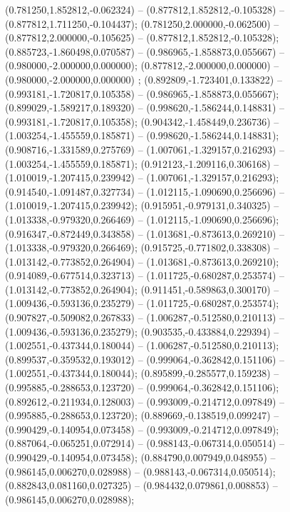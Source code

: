  (0.781250,1.852812,-0.062324) -- (0.877812,1.852812,-0.105328) -- (0.877812,1.711250,-0.104437);
 (0.781250,2.000000,-0.062500) -- (0.877812,2.000000,-0.105625) -- (0.877812,1.852812,-0.105328);
 (0.885723,-1.860498,0.070587) -- (0.986965,-1.858873,0.055667) -- (0.980000,-2.000000,0.000000);
 (0.877812,-2.000000,0.000000) -- (0.980000,-2.000000,0.000000) ;
 (0.892809,-1.723401,0.133822) -- (0.993181,-1.720817,0.105358) -- (0.986965,-1.858873,0.055667);
 (0.899029,-1.589217,0.189320) -- (0.998620,-1.586244,0.148831) -- (0.993181,-1.720817,0.105358);
 (0.904342,-1.458449,0.236736) -- (1.003254,-1.455559,0.185871) -- (0.998620,-1.586244,0.148831);
 (0.908716,-1.331589,0.275769) -- (1.007061,-1.329157,0.216293) -- (1.003254,-1.455559,0.185871);
 (0.912123,-1.209116,0.306168) -- (1.010019,-1.207415,0.239942) -- (1.007061,-1.329157,0.216293);
 (0.914540,-1.091487,0.327734) -- (1.012115,-1.090690,0.256696) -- (1.010019,-1.207415,0.239942);
 (0.915951,-0.979131,0.340325) -- (1.013338,-0.979320,0.266469) -- (1.012115,-1.090690,0.256696);
 (0.916347,-0.872449,0.343858) -- (1.013681,-0.873613,0.269210) -- (1.013338,-0.979320,0.266469);
 (0.915725,-0.771802,0.338308) -- (1.013142,-0.773852,0.264904) -- (1.013681,-0.873613,0.269210);
 (0.914089,-0.677514,0.323713) -- (1.011725,-0.680287,0.253574) -- (1.013142,-0.773852,0.264904);
 (0.911451,-0.589863,0.300170) -- (1.009436,-0.593136,0.235279) -- (1.011725,-0.680287,0.253574);
 (0.907827,-0.509082,0.267833) -- (1.006287,-0.512580,0.210113) -- (1.009436,-0.593136,0.235279);
 (0.903535,-0.433884,0.229394) -- (1.002551,-0.437344,0.180044) -- (1.006287,-0.512580,0.210113);
 (0.899537,-0.359532,0.193012) -- (0.999064,-0.362842,0.151106) -- (1.002551,-0.437344,0.180044);
 (0.895899,-0.285577,0.159238) -- (0.995885,-0.288653,0.123720) -- (0.999064,-0.362842,0.151106);
 (0.892612,-0.211934,0.128003) -- (0.993009,-0.214712,0.097849) -- (0.995885,-0.288653,0.123720);
 (0.889669,-0.138519,0.099247) -- (0.990429,-0.140954,0.073458) -- (0.993009,-0.214712,0.097849);
 (0.887064,-0.065251,0.072914) -- (0.988143,-0.067314,0.050514) -- (0.990429,-0.140954,0.073458);
 (0.884790,0.007949,0.048955) -- (0.986145,0.006270,0.028988) -- (0.988143,-0.067314,0.050514);
 (0.882843,0.081160,0.027325) -- (0.984432,0.079861,0.008853) -- (0.986145,0.006270,0.028988);
